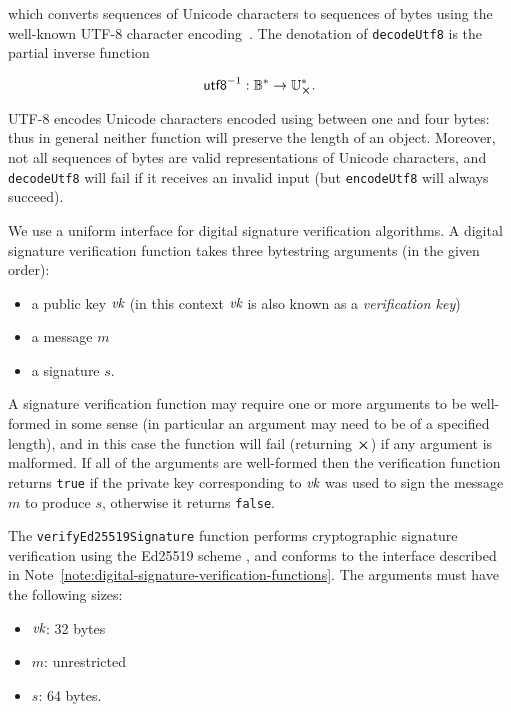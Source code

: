 \noindent which converts sequences of Unicode characters to sequences of bytes using the
well-known UTF-8 character encoding~\cite[Definition  D92]{Unicode-standard}.
The denotation of \texttt{decodeUtf8} is the partial inverse function

$$
\unutfeight: \B^* \rightarrow \U^*_{\errorX}.
$$

\noindent UTF-8 encodes Unicode characters encoded using between one and four
bytes: thus in general neither function will preserve the length of an object.
Moreover, not all sequences of bytes are valid representations of Unicode
characters, and \texttt{decodeUtf8} will fail if it receives an invalid input
(but \texttt{encodeUtf8} will always succeed).




\label{note:digital-signature-verification-functions}
We use a uniform interface for digital signature verification algorithms. A
digital signature verification function takes three bytestring arguments (in the
given order):
\begin{itemize}
  \item a public key $\textit{vk}$ (in this context $\textit{vk}$ is also known as a \textit{verification key}) 
  \item a message $m$
  \item a signature  $s$.
\end{itemize}
\noindent A signature verification function may require one
or more arguments to be well-formed in some sense (in particular an argument
may need to be of a specified length), and in this case the function will fail
(returning $\errorX$) if any argument is malformed. If all of the arguments are
well-formed then the verification function returns \texttt{true} if the private
key corresponding to $\textit{vk}$ was used to sign the message $m$ to produce $s$,
otherwise it returns \texttt{false}.

\label{note:ed25519-signature-verification}
The \texttt{verifyEd25519Signature}
function performs cryptographic
signature verification using the Ed25519 scheme \cite{ches-2011-24091,
  rfc8032-EdDSA}, and conforms to the interface described in
Note~\ref{note:digital-signature-verification-functions}.  The arguments must
have the following sizes:
\begin{itemize}
\item $\textit{vk}$: 32 bytes
\item $m$: unrestricted
\item $s$: 64 bytes.
\end{itemize}



